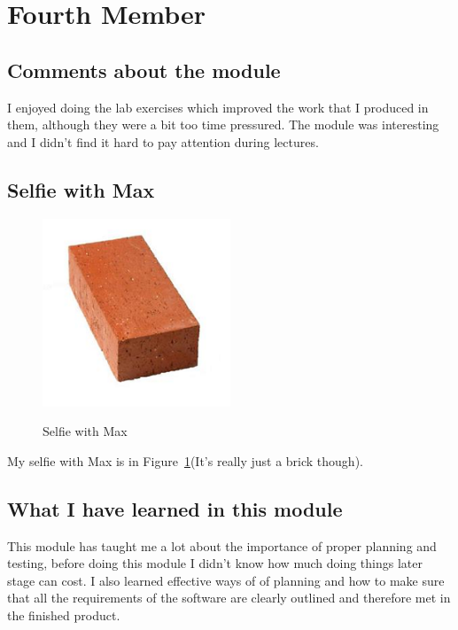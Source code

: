 \section{Fourth Member}
\subsection{Comments about the module}
I enjoyed doing the lab exercises which improved the work that I produced in them, although they were a bit too time pressured. The module was interesting and I didn't find it hard to pay attention during lectures.

\subsection{Selfie with Max}
\begin{figure}[h]
\caption{Selfie with Max}
\centering
\includegraphics[width=0.5\textwidth]{brick.png}
\label{fig:selfie}
\end{figure}

My selfie with Max is in  Figure~\ref{fig:selfie}(It's really just a brick though).

\subsection{What I have learned in this module}
This module has taught me a lot about the importance of proper planning and testing, before doing this module I didn't know how much doing things later stage can cost. I also learned effective ways of of planning and how to make sure that all the requirements of the software are clearly outlined and therefore met in the finished product.

